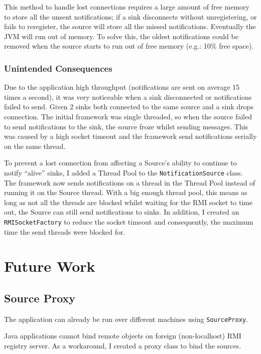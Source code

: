 \documentclass[a4paper]{article}
\begin{document}
This method to handle lost connections requires a large amount of free memory to store all the unsent notifications;
 if a sink disconnects without unregistering, or fails to reregister, the source will store all the missed notifications.
Eventually the JVM will run out of memory.
To solve this, the oldest notifications could be removed when the source starts to run out of free memory (e.g.: 10\% free space).

\subsubsection{Unintended Consequences}
Due to the application high throughput (notifications are sent on average 15 times a second), it was very noticeable when a sink disconnected or notifications failed to send.
Given 2 sinks both connected to the same source and a sink drops connection.
The initial framework was single threaded, so when the source failed to send notifications to the sink, the source froze whilst sending messages.
This was caused by a high socket timeout and the framework send notifications serially on the same thread.

To prevent a lost connection from affecting a Source's ability to continue to notify ``alive'' sinks, I added a Thread Pool to the \texttt{NotificationSource} class.
The framework now sends notifications on a thread in the Thread Pool instead of running it on the Source thread.
With a big enough thread pool, this means as long as not all the threads are blocked whilst waiting for the RMI socket to time out, the Source can still send notifications to sinks.
In addition, I created an \texttt{RMISocketFactory} to reduce the socket timeout and consequently, the maximum time the send threads were blocked for.

\section{Future Work}
\subsection{Source Proxy}\label{sec:source_proxy}
The application can already be run over different machines using \texttt{SourceProxy}.

Java applications cannot bind remote objects on foreign (non-localhost) RMI registry server.
As a workaround, I created a proxy class to bind the sources.
\end{document}

